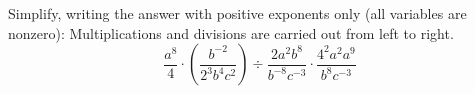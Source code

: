 Simplify, writing the answer with positive exponents only (all variables are nonzero): Multiplications and divisions are carried out from left to right.
\[
\dfrac{a^8}{4}\cdot\left(\dfrac{b^{-2}}{2^3b^4c^2}\right)\div\dfrac{2a^2b^8}{b^{-8}c^{-3}}\cdot\dfrac{4^2a^2a^9}{b^8c^{-3}}
\]
